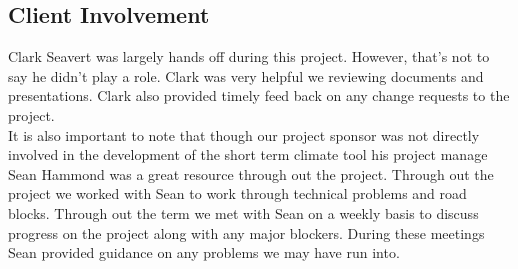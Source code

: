 \documentclass[onecolumn, draftclsnofoot,10pt, compsoc]{article}
\begin{document}
        \subsection{Client Involvement}
            Clark Seavert was largely hands off during this project. However, that's not to say he didn't play a role. Clark was very helpful we reviewing documents and presentations. Clark also provided timely feed back on any change requests to the project.\\

            It is also important to note that though our project sponsor was not directly involved in the development of the short term climate tool his project manage Sean Hammond was a great resource through out the project. Through out the project we worked with Sean to work through technical problems and road blocks. Through out the term we met with Sean on a weekly basis to discuss progress on the project along with any major blockers. During these meetings Sean provided guidance on any problems we may have run into.\\
\end{document}
